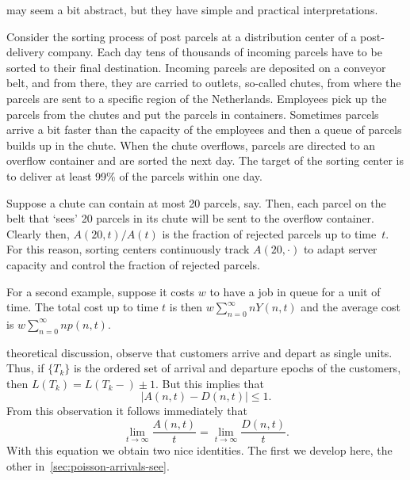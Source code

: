  may seem a bit abstract, but they have simple and practical interpretations.

Consider the sorting process of post parcels at a distribution center of a post-delivery company.
Each day tens of thousands of incoming parcels have to be sorted to their final destination.
Incoming parcels are deposited on a conveyor belt, and from there, they are carried to outlets, so-called chutes, from where the parcels are sent to a specific region of the Netherlands.
Employees pick up the parcels from the chutes and put the parcels in containers.
Sometimes parcels arrive a bit faster than the capacity of the employees and then a queue of parcels builds up in the chute.
When the chute overflows, parcels are directed to an overflow container and are sorted the next day.
The target of the sorting center is to deliver at least 99\% of the parcels within one day.

Suppose a chute can contain at most 20 parcels, say.
Then, each parcel on the belt that `sees' 20 parcels in its chute will be sent to the overflow container. 
Clearly then, $A(20,t)/A(t)$ is the fraction of rejected parcels up to time~$t$.
For this reason,  sorting centers continuously track $A(20,\cdot)$ to adapt server capacity and control the fraction of rejected parcels.

For a second example, suppose it costs $w$ to have a job in queue for a unit of time.
The total cost up to time $t$ is then $w \sum_{n=0}^\infty n Y(n,t)$ and the average cost is
$w \sum_{n=0}^\infty n p(n,t)$.


 theoretical discussion, observe that customers arrive and depart as single units.
Thus, if $\{T_k\}$ is the ordered set of arrival and departure epochs of the customers, then $L(T_k) = L(T_k-) \pm 1$.
But this implies that
\begin{equation}\label{eq:97}
|A(n,t) - D(n,t)| \leq 1.
\end{equation}
From this observation it follows immediately that
\begin{equation}\label{eq:15}
 \lim_{t\to\infty} \frac{A(n,t)}t = \lim_{t\to\infty} \frac{D(n,t)}t.
\end{equation}
With this equation we obtain two nice identities.
The first we develop here, the other in~\cref{sec:poisson-arrivals-see}.

